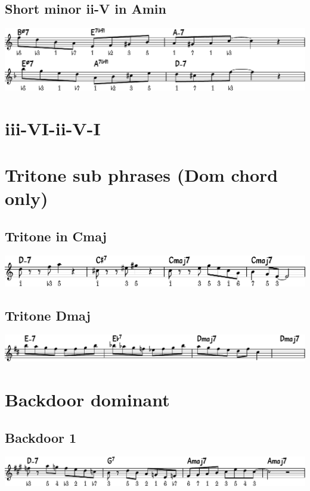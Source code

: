 \documentclass[11pt]{article}
\begin{document}
\subsection{Short minor ii-V in Amin}
\label{sec:org2029d08}
\begin{center}
\includegraphics[width=.98\linewidth]{short-ii-v-in-Amin.pdf}
\end{center}

\section{iii-VI-ii-V-I}
\label{sec:orgae4b178}
\section{Tritone sub phrases (Dom chord only)}
\label{sec:orge89292d}

\subsection{Tritone in Cmaj}
\label{sec:orgd827cd9}
\begin{center}
\includegraphics[width=.98\linewidth]{tritone-c-maj.pdf}
\end{center}

\subsection{Tritone Dmaj}
\label{sec:org0b0c73d}
\begin{center}
\includegraphics[width=.98\linewidth]{tritone-d-maj.pdf}
\end{center}


\section{Backdoor dominant}
\label{sec:org79ce31d}

\subsection{Backdoor 1}
\label{sec:org48372dc}
\begin{center}
\includegraphics[width=.98\linewidth]{backdoor-1.pdf}
\end{center}
\end{document}
